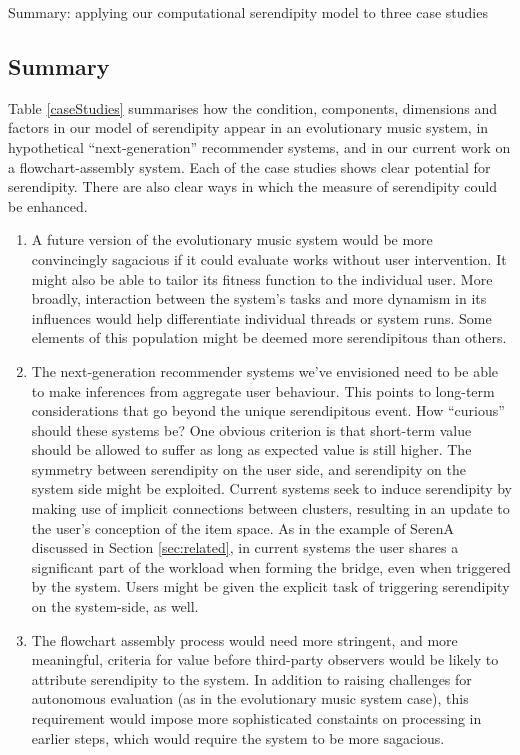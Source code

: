 \begin{table}[p]
\caption{Summary: applying our computational serendipity model to three case studies\label{caseStudies}}
\end{table}

\subsection{Summary}

Table \ref{caseStudies} summarises how the condition, components,
dimensions and factors in our model of serendipity appear in an
evolutionary music system, in hypothetical ``next-generation''
recommender systems, and in our current work on a flowchart-assembly
system.  Each of the case studies shows clear potential for
serendipity.  There are also clear ways in which the measure of
serendipity could be enhanced.

\begin{enumerate}
\item A future version of the evolutionary music system would be more
  convincingly sagacious if it could evaluate works without user
  intervention.  It might also be able to tailor its fitness function
  to the individual user.  More broadly, interaction between the
  system's tasks and more dynamism in its influences would help
  differentiate individual threads or system runs.  Some elements of
  this population might be deemed more serendipitous than others.

\item The next-generation recommender systems we've envisioned need to
  be able to make inferences from aggregate user behaviour.  This
  points to long-term considerations that go beyond the unique
  serendipitous event.  How ``curious'' should these systems be?  One
  obvious criterion is that short-term value should be allowed to
  suffer as long as expected value is still higher.  The symmetry
  between serendipity on the user side, and serendipity on the system
  side might be exploited.  Current systems seek to induce serendipity
  by making use of implicit connections between clusters, resulting in
  an update to the user's conception of the item space.  As in the
  example of {\sf SerenA} discussed in Section \ref{sec:related}, in
  current systems the user shares a significant part of the workload
  when forming the bridge, even when triggered by the system.  Users
  might be given the explicit task of triggering serendipity on the
  system-side, as well.

\item The flowchart assembly process would need more stringent, and
  more meaningful, criteria for value before third-party observers
  would be likely to attribute serendipity to the system.  In addition
  to raising challenges for autonomous evaluation (as in the
  evolutionary music system case), this requirement would impose more
  sophisticated constaints on processing in earlier steps, which would
  require the system to be more sagacious.
\end{enumerate}

